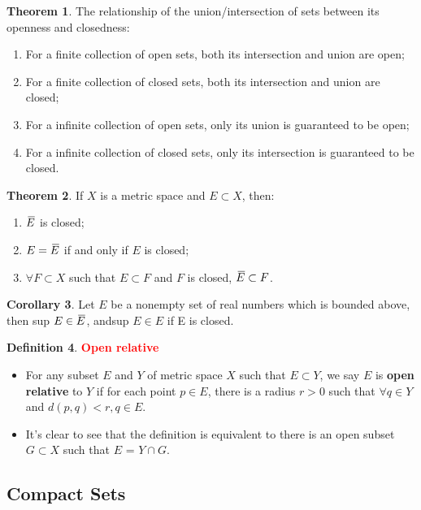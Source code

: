 \documentclass[12pt,a4paper]{article}
\theoremstyle{definition}
\newtheorem{thm}{Theorem}[subsection]
\newtheorem{dfn}[thm]{Definition}
\newtheorem{cor}[thm]{Corollary}
\newcommand{\closure}[2][3]{{}\mkern#1mu\overline{\mkern-#1mu#2}}
\begin{document}
\begin{thm} The relationship of the union/intersection of sets between its openness and closedness:
    \begin{enumerate}
        \item For a finite collection of open sets, both its intersection and union are open;
        \item For a finite collection of closed sets, both its intersection and union are closed;
        \item For a infinite collection of open sets, only its union is guaranteed to be open;
        \item For a infinite collection of closed sets, only its intersection is guaranteed to be closed.
    \end{enumerate}
\end{thm}

\begin{thm} If $X$ is a metric space and $E \subset X$, then:
    \begin{enumerate}
        \item $\closure{E}$ is closed;
        \item $E = \closure{E}$ if and only if $E$ is closed;
        \item $\forall F \subset X$ such that $E \subset F$ and $F$ is closed, $\closure{E} \subset F$.
    \end{enumerate}
\end{thm}

\begin{cor}
    Let $E$ be a nonempty set of real numbers which is bounded above, then\; sup $E \in \closure{E}$, and\;sup $E \in E$ if E is closed.
\end{cor}

\begin{dfn} \textcolor{RED}{\bf Open relative}
    \begin{itemize}
        \item For any subset $E$ and $Y$ of metric space $X$ such that $E \subset Y$, we say $E$ is {\bf open relative} to $Y$ if for
            each point $p \in E$, there is a radius $r > 0$ such that $\forall q \in Y$ and $d(p, q) < r, q \in E$.
        \item It's clear to see that the definition is equivalent to there is an open subset $G \subset X$ such that $E$ = $Y \cap G$.
    \end{itemize}
\end{dfn}

\subsection{Compact Sets}
\end{document}
